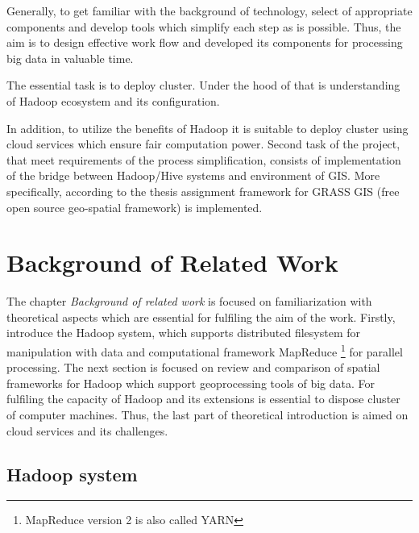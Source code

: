 \documentclass[a4paper,12pt,oneside]{report}
\begin{document}
	Generally, to get familiar with the background of technology,
	select of appropriate components and develop tools which simplify each step as is
	possible. 
	Thus, the aim is to design effective work flow and developed its
	components for processing big data in valuable time.
	
	The essential task is to deploy cluster. Under the hood of that is
	understanding of Hadoop ecosystem and its configuration. 
	
	In addition, to utilize the benefits of Hadoop it is suitable to deploy cluster using cloud
	services which ensure fair computation power. Second task of the project, that meet
	requirements of the process simplification, consists of implementation
	of the bridge between Hadoop/Hive systems and environment of GIS. More specifically,
	according to the thesis assignment framework for GRASS GIS (free open source geo-spatial framework) is implemented. 

	
	
	\newpage
	\chapter*{Background of Related Work}
	The chapter \textit{Background of related work} is focused on familiarization
	with theoretical aspects which are essential for fulfiling the aim of the work.
	Firstly, introduce the Hadoop system, which supports distributed filesystem for
	manipulation with data and computational framework MapReduce \footnote{MapReduce version 2 is also called YARN} for
	parallel processing. 
	The next section is focused on review and comparison of spatial frameworks for
	Hadoop which support geoprocessing tools of big data. For fulfiling the
	capacity of Hadoop and its extensions is essential to dispose cluster of computer
	machines. Thus, the last  part of theoretical introduction is aimed on cloud
	services and its challenges.
	\section{Hadoop system}
	\label{sec:hadoop}
\end{document}
